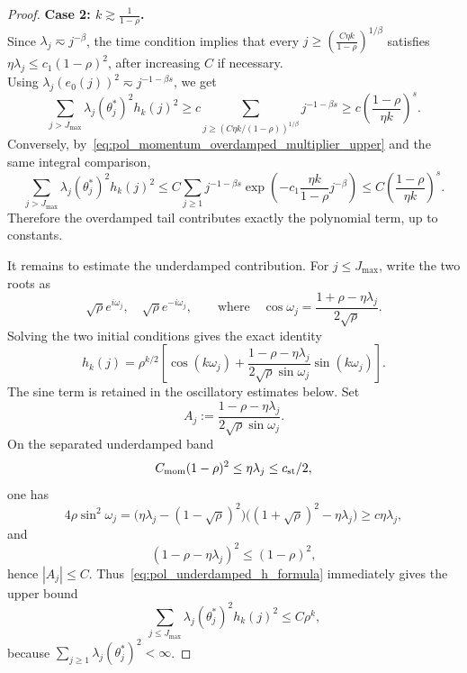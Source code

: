 \begin{proof}
\textbf{Case 2: $k \gtrsim \frac{1}{1-\rho}$.} \\
Since $\lambda_j\eqsim j^{-\beta}$, the time condition implies that every
$j\ge \left(\frac{C\eta k}{1-\rho}\right)^{1/\beta}$
satisfies $\eta\lambda_j\le c_1(1-\rho)^2$, after increasing $C$ if necessary. \\
Using
$\lambda_j(e_0(j))^2\eqsim j^{-1-\beta s}$, we get
\begin{equation}
\label{eq:pol_momentum_poly_lower}
    \sum_{j > J_{\max}} \lambda_j(\theta_j^*)^2 h_k(j)^2
    \ge
    c\sum_{j\ge (C\eta k/(1-\rho))^{1/\beta}}j^{-1-\beta s}
    \ge
    c\left(\frac{1-\rho}{\eta k}\right)^s .
\end{equation}
Conversely, by~\eqref{eq:pol_momentum_overdamped_multiplier_upper} and the same integral comparison,
\begin{equation*}
    \sum_{j > J_{\max}}
    \lambda_j(\theta_j^*)^2h_k(j)^2
    \le
    C\sum_{j\ge1}j^{-1-\beta s}
    \exp\left(-c_1\frac{\eta k}{1-\rho}j^{-\beta}\right)
    \le
    C\left(\frac{1-\rho}{\eta k}\right)^s .
\end{equation*}
Therefore the overdamped tail contributes exactly the polynomial term, up to constants.

It remains to estimate the underdamped contribution. For $j \le J_{\max}$, write the two roots as
\[
    \sqrt{\rho}e^{i\omega_j},
    \quad
    \sqrt{\rho}e^{-i\omega_j},
    \qquad \text{where} \quad
    \cos \omega_j=\frac{1+\rho-\eta\lambda_j}{2\sqrt \rho}.
\]
Solving the two initial conditions gives the exact identity
\begin{equation}
\label{eq:pol_underdamped_h_formula}
    h_k(j)
    =\rho^{k/2}
    \left[
        \cos(k\omega_j)
        +\frac{1-\rho-\eta\lambda_j}{2\sqrt{\rho}\sin \omega_j}
        \sin(k\omega_j)
    \right].
\end{equation}
The sine term is retained in the oscillatory estimates below. Set
\[
    A_j:=\frac{1-\rho-\eta\lambda_j}{2\sqrt{\rho}\sin \omega_j}.
\]
On the separated underdamped band
\[
    C_{\rm mom}(1-\rho)^2\le \eta\lambda_j\le c_{\rm st}/2,
\]
one has
\[
    4\rho\sin^2\omega_j
    =\bigl(\eta\lambda_j-(1-\sqrt\rho)^2\bigr)
     \bigl((1+\sqrt\rho)^2-\eta\lambda_j\bigr)
    \ge c\eta\lambda_j,
\]
and
\[
    (1-\rho-\eta\lambda_j)^2
    \le(1-\rho)^2,
\]
hence $|A_j|\le C$. 
Thus~\eqref{eq:pol_underdamped_h_formula} immediately gives the upper bound
\begin{equation*}
    \sum_{j \le J_{\max}}
    \lambda_j(\theta_j^*)^2h_k(j)^2
    \le
    C\rho^k,
\end{equation*}
because $\sum_{j\ge1}\lambda_j(\theta_j^*)^2<\infty$.


\end{proof}

